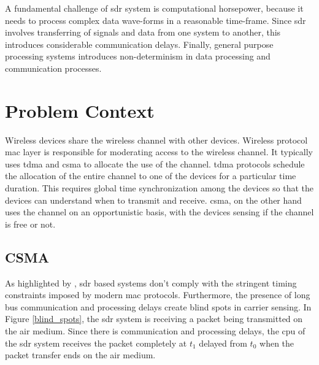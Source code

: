 
A fundamental challenge of \ac{sdr} system is computational horsepower, because it needs to process complex data wave-forms in a reasonable time-frame. Since \ac{sdr} involves transferring of signals and data from one system to another, this introduces considerable communication delays. Finally, general purpose processing systems introduces non-determinism in data processing and communication processes.\\


\section{Problem Context}
Wireless devices share the wireless channel with other devices. Wireless protocol \ac{mac} layer is responsible for moderating access to the wireless channel. It typically uses \ac{tdma} and \ac{csma} to allocate the use of the channel. \ac{tdma} protocols schedule the allocation of the entire channel to one of the devices for a particular time duration. This requires global time synchronization among the devices so that the devices can understand when to transmit and receive. \ac{csma}, on the other hand uses the channel on an opportunistic basis, with the devices sensing if the channel is free or not.\\

\subsection{CSMA}
As highlighted by \cite{schmid_experimental_2007}, \ac{sdr} based systems don't comply with the stringent timing constraints imposed by modern \ac{mac} protocols. Furthermore, the presence of long bus communication and processing delays create blind spots\cite{schmid_experimental_2007} in carrier sensing. In Figure \ref{blind_spots}, the \ac{sdr} system is receiving a packet being transmitted on the air medium. Since there is communication and processing delays, the \ac{cpu} of the \ac{sdr} system  receives the packet completely at $t_1$ delayed from $t_0$ when the packet transfer ends on the air medium.\\

